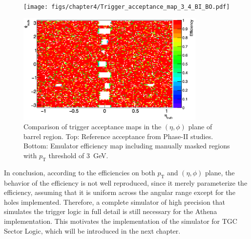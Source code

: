 \begin{figure}[htbp]
  \centering
  \texttt{[image: figs/chapter4/Trigger\_acceptance\_map\_3\_4\_BI\_BO.pdf]}
  \vspace{0.5em}
  
  \includegraphics[width=0.83\textwidth]{figs/chapter4/efficiency_eta_phi_2D_new.png}
  
  \caption{Comparison of trigger acceptance maps in the $(\eta, \phi)$ plane of barrel region. Top: Reference acceptance from Phase-II studies. Bottom: Emulator efficiency map including manually masked regions with $p_\mathrm{T}$ threshold of 3~GeV.}
  \label{fig:eta_phi_comparison}
\end{figure}

In conclusion, according to the efficiencies on both $p_\mathrm{T}$ and $(\eta, \phi)$ plane, the behavior of the efficiency is not well reproduced, since it merely parameterize the efficiency, assuming that it is uniform across the angular range except for the holes implemented. Therefore, a complete simulator of high precision that simulates the trigger logic in full detail is still necessary for the Athena implementation. This motivates the implementation of the simulator for TGC Sector Logic, which will be introduced in the next chapter.

